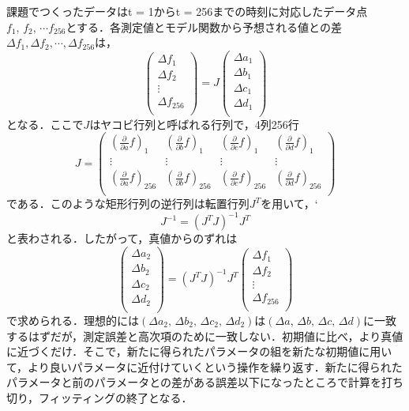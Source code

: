 課題でつくったデータはt = 1からt = 256までの時刻に対応したデータ点$f_{1},\,f_{2},\,\cdots  f_{256}$とする．各測定値とモデル関数から予想される値との差$\Delta f_1,\Delta f_2,\cdots,\Delta f_{256}$は，
\begin{equation}
\left(\begin{array}{c}\Delta f _{1} \\\Delta f _{2} \\ \vdots \\\Delta f _{256} \\\end{array}\right)=J \left(\begin{array}{c}\Delta a _{1} \\\Delta b _{1} \\\Delta c _{1} \\\Delta d _{1} \\\end{array}\right)
\end{equation}
となる．ここで$J$はヤコビ行列と呼ばれる行列で，4列256行
\begin{equation}
\displaystyle J =\left(\begin{array}{cccc}\left(\frac{\partial }{\partial a }f \right)_{1} & \left(\frac{\partial }{\partial b }f \right)_{1} & \left(\frac{\partial }{\partial c }f \right)_{1} & \left(\frac{\partial }{\partial d }f \right)_{1} \\ \vdots & \vdots  &  \vdots & \vdots  \\\left(\frac{\partial }{\partial a }f \right)_{256} & \left(\frac{\partial }{\partial b }f \right)_{256} & \left(\frac{\partial }{\partial c }f \right)_{256} & \left(\frac{\partial }{\partial d }f \right)_{256} \\\end{array}\right)
\end{equation}
である．このような矩形行列の逆行列は転置行列$J^T$を用いて，`
\begin{equation}
J ^{-1}=\left(J ^{T }J \right)^{-1}J ^{T }
\end{equation}
と表わされる．したがって，真値からのずれは
\begin{equation}
\left(\begin{array}{c}\Delta a_2 \\\Delta b_2 \\\Delta c_2 \\\Delta d_2 \\\end{array}\right)
=\left(J ^{T }J \right)^{-1}J ^{T }
\left(\begin{array}{c}\Delta f _{1} \\\Delta f _{2} \\ \vdots \\\Delta f _{256} \\\end{array}\right)
\end{equation}
で求められる．理想的には$(\Delta a_2,\,\Delta b_2,\,\Delta c_2,\,\Delta d_2)$は$(\Delta a,\,\Delta b,\,\Delta c,\,\Delta d)$に一致するはずだが，測定誤差と高次項のために一致しない．初期値に比べ，より真値に近づくだけ．そこで，新たに得られたパラメータの組を新たな初期値に用いて，より良いパラメータに近付けていくという操作を繰り返す．新たに得られたパラメータと前のパラメータとの差がある誤差以下になったところで計算を打ち切り，フィッティングの終了となる．

